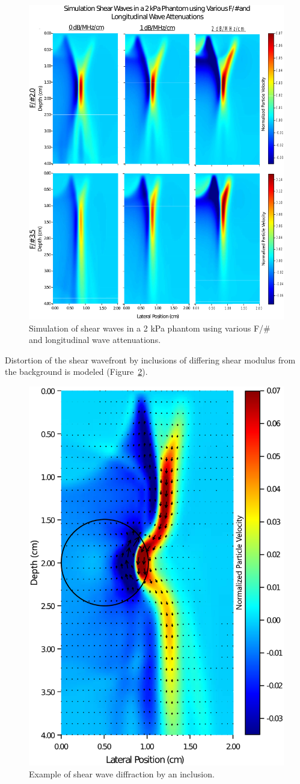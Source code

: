 \begin{figure}[htb!]
    \centering
    \includegraphics[width=0.75\linewidth]{steve/figs/image13.png}
    \caption{Simulation of shear waves in a 2 kPa phantom using various F/\# and
    longitudinal wave attenuations.}
\label{fig:steve-full-wave-results}
\end{figure}

Distortion of the shear wavefront by inclusions of differing shear modulus from
the background is modeled (Figure~\ref{fig:steve-diffraction}). 

\begin{figure}[htb!]
    \centering
    \includegraphics[width=0.4\linewidth]{steve/figs/image14.png}
    \caption{Example of shear wave diffraction by an inclusion.}
\label{fig:steve-diffraction}
\end{figure}

